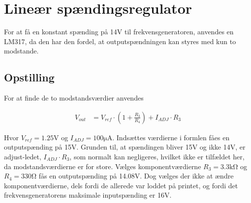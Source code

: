 \section{Lineær spændingsregulator}\label{sec:lm317}
For at få en konstant spænding på 14\si{\volt} til frekvensgeneratoren, anvendes en LM317, da den har den fordel, at outputspændningen kan styres med kun to modstande.


\subsection{Opstilling}


For at finde de to modstandsværdier anvendes

\begin{align}
	V_{out} & = V_{ref} \cdot \left( 1 + \frac{R_3}{R_4} \right) + I_{ADJ} \cdot R_3
\end{align}

Hvor $V_{ref} = 1.25\si{\volt}$ og $I_{ADJ} = 100\si{\micro\ampere}$. Indsættes værdierne i formlen fåes en outputspænding på 15\si{\volt}. Grunden til, at spændingen bliver 15\si{\volt} og ikke 14\si{\volt}, er adjust-ledet, $I_{ADJ} \cdot R_3$, som normalt kan negligeres, hvilket ikke er tilfældet her, da modstandsværdierne er for store. Vælges komponentværdierne $R_3 = 3.3\si{\kilo\ohm}$ og $R_4 = 330\si{\ohm}$ fås en outputspænding på 14.08\si{\volt}. Dog vælges der ikke at ændre komponentværdierne, dels fordi de allerede var loddet på printet, og fordi det frekvensgeneratorens maksimale inputspænding er 16\si{\volt}.